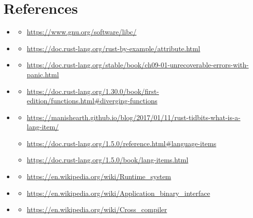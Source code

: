 \documentclass{article}
\begin{document}
 \section{References}
 \begin{itemize}
    \item \hypertarget{ref:libc}{\textbf{\color{medium}{libc}}}
    \begin{itemize}
        \item \url{https://www.gnu.org/software/libc/}
    \end{itemize}
    \item \hypertarget{ref:attribute}{\textbf{\color{medium}{attribute}}}
    \begin{itemize}
        \item \url{https://doc.rust-lang.org/rust-by-example/attribute.html}
    \end{itemize}
    \item \hypertarget{ref:panic}{\textbf{\color{medium}{panic}}}
    \begin{itemize}
        \item \url{https://doc.rust-lang.org/stable/book/ch09-01-unrecoverable-errors-with-panic.html}
    \end{itemize}
    \item \hypertarget{ref:diverging-function}{\textbf{\color{medium}{Diverging Function}}}
    \begin{itemize}
        \item \url{https://doc.rust-lang.org/1.30.0/book/first-edition/functions.html#diverging-functions}
    \end{itemize}
    \item \hypertarget{ref:language-item}{\textbf{\color{medium}{Language Items}}}
    \begin{itemize}
        \item \url{https://manishearth.github.io/blog/2017/01/11/rust-tidbits-what-is-a-lang-item/}
        \item \url{https://doc.rust-lang.org/1.5.0/reference.html#language-items}
        \item \url{https://doc.rust-lang.org/1.5.0/book/lang-items.html}
    \end{itemize}
    \item \hypertarget{ref:runtime-environment}{\textbf{\color{medium}{Runtime Environment}}}
    \begin{itemize}
        \item \url{https://en.wikipedia.org/wiki/Runtime_system}
    \end{itemize}
    \item \hypertarget{ref:non}{\textbf{\color{medium}{ABI}}}
    \begin{itemize}
        \item \url{https://en.wikipedia.org/wiki/Application_binary_interface}
    \end{itemize}
    \item \hypertarget{ref:non}{\textbf{\color{medium}{Cross Compiler}}}
    \begin{itemize}
        \item \url{https://en.wikipedia.org/wiki/Cross_compiler}
    \end{itemize}
 \end{itemize}
\end{document}
